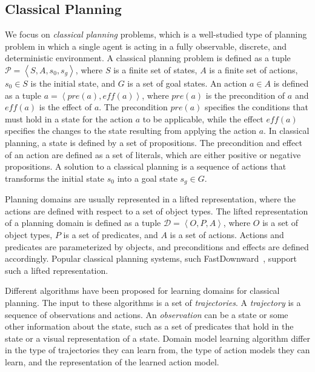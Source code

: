 \documentclass{article}
\theoremstyle{definition}
\theoremstyle{remark}
\newcommand{\tuple}[1]{\ensuremath{\left \langle #1 \right \rangle }}
\begin{document}
\subsection{Classical Planning}
We focus on \emph{classical planning} problems, which is a well-studied type of planning problem in which a single agent is acting in a fully observable, discrete, and deterministic environment. 
A classical planning problem is defined as a tuple $\mathcal{P} = \tuple{S, A, s_0, s_g}$, where $S$ is a finite set of states, $A$ is a finite set of actions, $s_0 \in S$ is the initial state, and $G$ is a set of goal states. 
An action $a\in A$ is defined as a tuple $a = \tuple{\mathit{pre}(a), \mathit{eff}(a)}$, where $\mathit{pre}(a)$ is the precondition of $a$ and $\mathit{eff}(a)$ is the effect of $a$. 
The precondition $\mathit{pre}(a)$ specifies the conditions that must hold in a state for the action $a$ to be applicable, while the effect $\mathit{eff}(a)$ specifies the changes to the state resulting from applying the action $a$.   
In classical planning, a state is defined by a set of propositions.  
The precondition and effect of an action are defined as a set of literals, which are either positive or negative propositions. 
A solution to a classical planning is a sequence of actions that transforms the initial state $s_0$ into a goal state $s_g\in G$.   


Planning domains are usually represented in a lifted representation, where the actions are defined with respect to a set of object types.
The lifted representation of a planning domain is defined as a tuple $\mathcal{D} = \tuple{O, P, A}$, where $O$ is a set of object types, $P$ is a set of predicates, and $A$ is a set of actions. Actions and predicates are parameterized by objects, and preconditions and effects are defined accordingly. 
Popular classical planning systems, such FastDownward~\citep{helmert2006fast}, support such a lifted representation. 

Different algorithms have been proposed for learning domains for classical planning. 
The input to these algorithms is a set of \emph{trajectories}. 
A \emph{trajectory} is a sequence of observations and actions. 
An \emph{observation} can be a state or some other information about the state, 
such as a set of predicates that hold in the state or a visual representation of a state. 
Domain model learning algorithm differ in the type of trajectories they can learn from, the type of action models they can learn, and the representation of the learned action model. 
\end{document}
